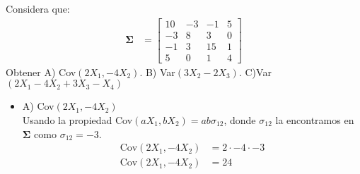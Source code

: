 \begin{problem}{3}
Considera que:
\begin{align*}
\mathbf{\Sigma} &=
\begin{bmatrix}
10&-3&-1&5\\
-3&8&3&0\\
-1&3&15&1\\
5&0&1&4
\end{bmatrix}
\end{align*}
Obtener A) Cov$(2X_1,-4X_2)$. B) Var$(3X_2-2X_3)$. C)Var$(2X_1-4X_2+3X_3-X_4)$
\end{problem}

\begin{sol}
\begin{itemize}
\item A) Cov$(2X_1,-4X_2)$\\
Usando la propiedad Cov$(aX_1,bX_2)=ab \sigma_{12}$, donde $\sigma_{12}$ la encontramos en $\mathbf{\Sigma}$ como $\sigma_{12}=-3$.
\begin{align*}
\text{Cov}(2X_1,-4X_2) &= 2 \cdot -4 \cdot -3 \\
\text{Cov}(2X_1,-4X_2) &=  24
\end{align*}


\end{itemize}
\end{sol}
